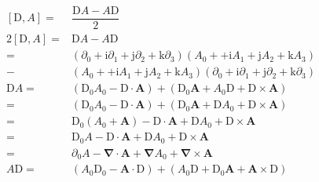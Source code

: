 \documentclass[
]{book}
\theoremstyle{definition}
\theoremstyle{definition}
\theoremstyle{definition}
\theoremstyle{definition}
\theoremstyle{remark}
\begin{document}
\[
\begin{aligned}
\left[\mathrm{D},A\right]= & \dfrac{\mathrm{D}A-A\mathrm{D}}{2}\\
2\left[\mathrm{D},A\right]= & \mathrm{D}A-A\mathrm{D}\\
= & \left(\partial_{{\scriptscriptstyle 0}}+\mathrm{i}\partial_{{\scriptscriptstyle 1}}+\mathrm{j}\partial_{{\scriptscriptstyle 2}}+\mathrm{k}\partial_{{\scriptscriptstyle 3}}\right)\left(A_{{\scriptscriptstyle 0}}++\mathrm{i}A_{{\scriptscriptstyle 1}}+\mathrm{j}A_{{\scriptscriptstyle 2}}+\mathrm{k}A_{{\scriptscriptstyle 3}}\right)\\
- & \left(A_{{\scriptscriptstyle 0}}++\mathrm{i}A_{{\scriptscriptstyle 1}}+\mathrm{j}A_{{\scriptscriptstyle 2}}+\mathrm{k}A_{{\scriptscriptstyle 3}}\right)\left(\partial_{{\scriptscriptstyle 0}}+\mathrm{i}\partial_{{\scriptscriptstyle 1}}+\mathrm{j}\partial_{{\scriptscriptstyle 2}}+\mathrm{k}\partial_{{\scriptscriptstyle 3}}\right)\\
\mathrm{D}A= & \left(\mathrm{D}_{{\scriptscriptstyle 0}}A_{{\scriptscriptstyle 0}}-\boldsymbol{\mathrm{D}}\cdot\boldsymbol{A}\right)+\left(\mathrm{D}_{{\scriptscriptstyle 0}}\boldsymbol{A}+A_{{\scriptscriptstyle 0}}\boldsymbol{\mathrm{D}}+\boldsymbol{\mathrm{D}}\times\boldsymbol{A}\right)\\
= & \left(\mathrm{D}_{{\scriptscriptstyle 0}}A_{{\scriptscriptstyle 0}}-\boldsymbol{\mathrm{D}}\cdot\boldsymbol{A}\right)+\left(\mathrm{D}_{{\scriptscriptstyle 0}}\boldsymbol{A}+\boldsymbol{\mathrm{D}}A_{{\scriptscriptstyle 0}}+\boldsymbol{\mathrm{D}}\times\boldsymbol{A}\right)\\
= & \mathrm{D}_{{\scriptscriptstyle 0}}\left(A_{{\scriptscriptstyle 0}}+\boldsymbol{A}\right)-\boldsymbol{\mathrm{D}}\cdot\boldsymbol{A}+\boldsymbol{\mathrm{D}}A_{{\scriptscriptstyle 0}}+\boldsymbol{\mathrm{D}}\times\boldsymbol{A}\\
= & \mathrm{D}_{{\scriptscriptstyle 0}}A-\boldsymbol{\mathrm{D}}\cdot\boldsymbol{A}+\boldsymbol{\mathrm{D}}A_{{\scriptscriptstyle 0}}+\boldsymbol{\mathrm{D}}\times\boldsymbol{A}\\
= & \partial_{{\scriptscriptstyle 0}}A-\boldsymbol{\nabla}\cdot\boldsymbol{A}+\boldsymbol{\nabla}A_{{\scriptscriptstyle 0}}+\boldsymbol{\nabla}\times\boldsymbol{A}\\
A\mathrm{D}= & \left(A_{{\scriptscriptstyle 0}}\mathrm{D}_{{\scriptscriptstyle 0}}-\boldsymbol{A}\cdot\boldsymbol{\mathrm{D}}\right)+\left(A_{{\scriptscriptstyle 0}}\boldsymbol{\mathrm{D}}+\mathrm{D}_{{\scriptscriptstyle 0}}\boldsymbol{A}+\boldsymbol{A}\times\boldsymbol{\mathrm{D}}\right)\\

\end{aligned}\]
\end{document}
